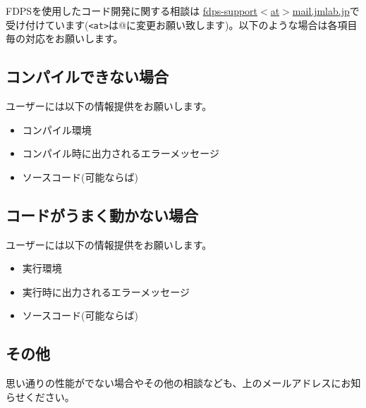 FDPSを使用したコード開発に関する相談は
\href{mailto:fdps-support@mail.jmlab.jp}{fdps-support$<$at$>$mail.jmlab.jp}で受け付けています(\texttt{<at>}は@に変更お願い致します)。以下のような場合は各項目毎の対応をお願いします。

\subsection{コンパイルできない場合}

ユーザーには以下の情報提供をお願いします。
\begin{itemize}
\item コンパイル環境
\item コンパイル時に出力されるエラーメッセージ
\item ソースコード(可能ならば)
\end{itemize}

\subsection{コードがうまく動かない場合}

ユーザーには以下の情報提供をお願いします。
\begin{itemize}
\item 実行環境
\item 実行時に出力されるエラーメッセージ
\item ソースコード(可能ならば)
\end{itemize}

\subsection{その他}

思い通りの性能がでない場合やその他の相談なども、上のメールアドレスにお知らせください。
